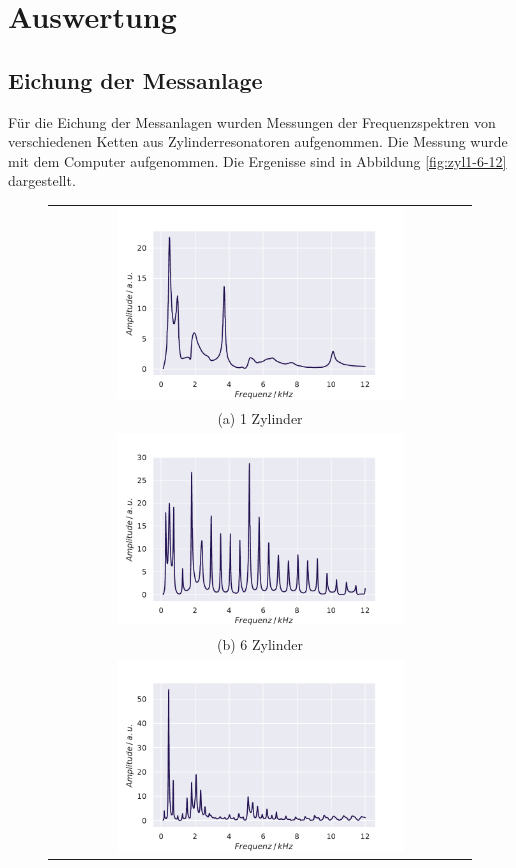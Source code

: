 \section{Auswertung}
\label{sec:auswertung}

\subsection{Eichung der Messanlage}
Für die Eichung der Messanlagen wurden Messungen der Frequenzspektren von verschiedenen Ketten aus Zylinderresonatoren aufgenommen. Die Messung wurde mit dem Computer aufgenommen. Die Ergenisse sind in 
Abbildung \ref{fig:zyl1-6-12} dargestellt. 
\begin{figure}[H]
    \centering
    \begin{tabular}{c}
      \includegraphics[width=0.7\textwidth]{Daten/Zyinder/Zylinder_1.pdf} \\
    (a) 1 Zylinder \\[6pt]
     \includegraphics[width=0.7\textwidth]{Daten/Zyinder/Zylinder_6.pdf} \\
    (b) 6 Zylinder \\[6pt]
    \includegraphics[width=0.7\textwidth]{Daten/Zyinder/Zylinder_12.pdf} \\

\end{tabular}
\end{figure}
